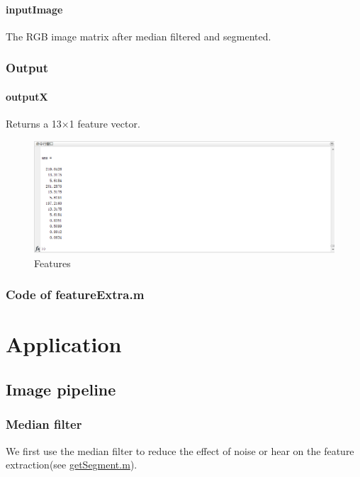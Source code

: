 \documentclass[14pt]{report} %
\begin{document}
\subsubsection{inputImage}
The RGB image matrix after median filtered and segmented.
\subsection{Output}
\subsubsection{outputX}
Returns a 13×1 feature vector.
	\begin{figure}[H]
		\includegraphics[width=\textwidth]{image/features.jpg} 
		\caption{Features} 
		 \label{fig:features} 
	\end{figure}
\clearpage
\subsection{Code of featureExtra.m}

	
\chapter{Application}
\clearpage
\section{Image pipeline}
\subsection{Median filter}
	We first use the median filter to reduce the effect of noise or hear on the feature extraction(see  \hyperref[section:getSegment.m]{getSegment.m}). 
\end{document}
